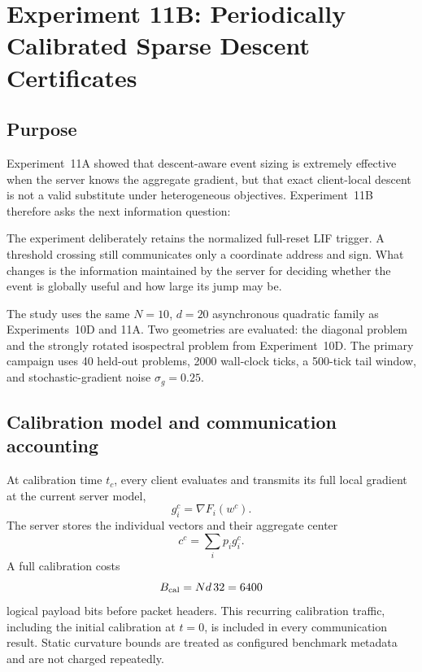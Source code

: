\section{Experiment 11B: Periodically Calibrated Sparse Descent Certificates}
\label{sec:exp11b}

\subsection{Purpose}

Experiment~11A showed that descent-aware event sizing is extremely effective when the server knows the aggregate gradient, but that exact client-local descent is not a valid substitute under heterogeneous objectives. Experiment~11B therefore asks the next information question:
\begin{center}
\end{center}
The experiment deliberately retains the normalized full-reset LIF trigger. A threshold crossing still communicates only a coordinate address and sign. What changes is the information maintained by the server for deciding whether the event is globally useful and how large its jump may be.

The study uses the same $N=10$, $d=20$ asynchronous quadratic family as Experiments~10D and 11A. Two geometries are evaluated: the diagonal problem and the strongly rotated isospectral problem from Experiment~10D. The primary campaign uses 40 held-out problems, 2000 wall-clock ticks, a 500-tick tail window, and stochastic-gradient noise $\sigma_g=0.25$.

\subsection{Calibration model and communication accounting}

At calibration time $t_c$, every client evaluates and transmits its full local gradient at the current server model,
\begin{equation}
  g_i^c=\nabla F_i(w^c).
\end{equation}
The server stores the individual vectors and their aggregate center
\begin{equation}
  c^c=\sum_i p_i g_i^c.
\end{equation}
A full calibration costs
\begin{equation}
  B_{\rm cal}=N d\,32=6400
\end{equation}
logical payload bits before packet headers. This recurring calibration traffic, including the initial calibration at $t=0$, is included in every communication result. Static curvature bounds are treated as configured benchmark metadata and are not charged repeatedly.

